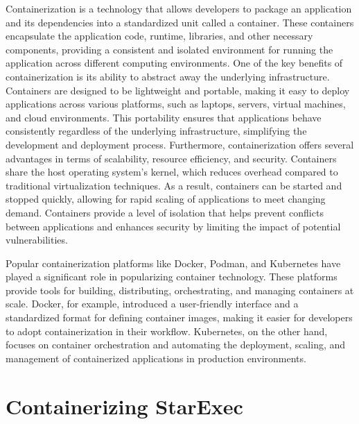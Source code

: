 \documentclass{easychair}
\begin{document}
Containerization is a technology that allows developers to package an application and its 
dependencies into a standardized unit called a container. 
These containers encapsulate the application code, runtime, libraries, and other necessary 
components, providing a consistent and isolated environment for running the application 
across different computing environments.
One of the key benefits of containerization is its ability to abstract away the underlying 
infrastructure. 
Containers are designed to be lightweight and portable, making it easy to deploy applications 
across various platforms, such as laptops, servers, virtual machines, and cloud environments. 
This portability ensures that applications behave consistently regardless of the underlying 
infrastructure, simplifying the development and deployment process.
Furthermore, containerization offers several advantages in terms of scalability, resource 
efficiency, and security. 
Containers share the host operating system's kernel, which reduces overhead compared to 
traditional virtualization techniques. 
As a result, containers can be started and stopped quickly, allowing for rapid scaling of 
applications to meet changing demand. 
Containers provide a level of isolation that helps prevent conflicts between applications and 
enhances security by limiting the impact of potential vulnerabilities.

Popular containerization platforms like Docker, Podman, and Kubernetes have played a significant 
role in popularizing container technology. 
These platforms provide tools for building, distributing, orchestrating, and managing containers 
at scale. 
Docker, for example, introduced a user-friendly interface and a standardized format for defining 
container images, making it easier for developers to adopt containerization in their workflow. 
Kubernetes, on the other hand, focuses on container orchestration and automating the deployment, 
scaling, and management of containerized applications in production environments.

\section{Containerizing StarExec}
\label{ContainerizingStarExec}

\end{document}

